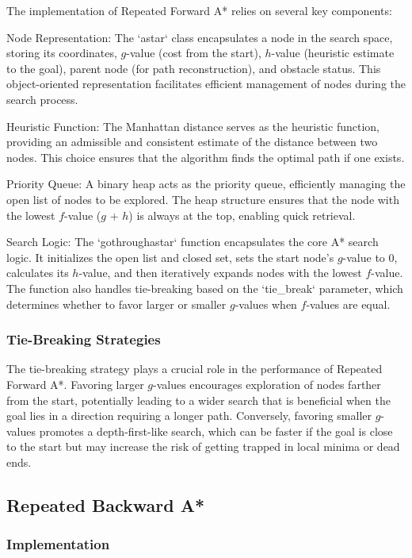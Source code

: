 \documentclass[12pt]{article}
\begin{document}
The implementation of Repeated Forward A* relies on several key components:

Node Representation: The `astar` class encapsulates a node in the search space, storing its coordinates, $g$-value (cost from the start), $h$-value (heuristic estimate to the goal), parent node (for path reconstruction), and obstacle status. This object-oriented representation facilitates efficient management of nodes during the search process.

Heuristic Function: The Manhattan distance serves as the heuristic function, providing an admissible and consistent estimate of the distance between two nodes. This choice ensures that the algorithm finds the optimal path if one exists.

Priority Queue: A binary heap acts as the priority queue, efficiently managing the open list of nodes to be explored. The heap structure ensures that the node with the lowest $f$-value ($g$ + $h$) is always at the top, enabling quick retrieval.

Search Logic: The `gothroughastar` function encapsulates the core A* search logic. It initializes the open list and closed set, sets the start node's $g$-value to 0, calculates its $h$-value, and then iteratively expands nodes with the lowest $f$-value. The function also handles tie-breaking based on the `tie\_break` parameter, which determines whether to favor larger or smaller $g$-values when $f$-values are equal.

\subsubsection{Tie-Breaking Strategies}

The tie-breaking strategy plays a crucial role in the performance of Repeated Forward A*. Favoring larger $g$-values encourages exploration of nodes farther from the start, potentially leading to a wider search that is beneficial when the goal lies in a direction requiring a longer path. Conversely, favoring smaller $g$-values promotes a depth-first-like search, which can be faster if the goal is close to the start but may increase the risk of getting trapped in local minima or dead ends.

\subsection{Repeated Backward A*}

\subsubsection{Implementation}
\end{document}
